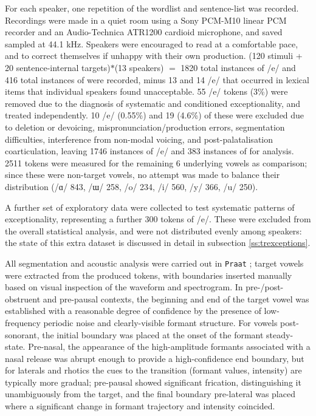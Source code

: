 For each speaker, one repetition of the wordlist and sentence-list was recorded. Recordings were made in a quiet room using a Sony PCM-M10 linear PCM recorder and an Audio-Technica ATR1200 cardioid microphone, and saved sampled at 44.1 kHz. Speakers were encouraged to read at a comfortable pace, and to correct themselves if unhappy with their own production. (120 stimuli + 20 sentence-internal targets)$*$(13 speakers) $=$ 1820 total instances of /e/ and 416 total instances of \ur{\o} were recorded, minus 13 \ur{\o} and 14 /e/ that occurred in lexical items that individual speakers found unacceptable. 55 /e/ tokens (3\%) were removed due to the diagnosis of systematic and conditioned exceptionality, and treated independently. 10 /e/ (0.55\%) and 19 \ur{\o} (4.6\%) of these were excluded due to deletion or devoicing, mispronunciation/production errors, segmentation difficulties, interference from non-modal voicing, and post-palatalisation coarticulation, leaving 1746 instances of /e/ and 383 instances of \ur{\o} for analysis. 2511 tokens were measured for the remaining 6 underlying vowels as comparison; since these were non-target vowels, no attempt was made to balance their distribution (/ɑ/ 843, /ɯ/ 258, /o/ 234, /i/ 560, /y/ 366, /u/ 250).

A further set of exploratory data were collected to test systematic patterns of exceptionality, representing a further 300 tokens of /e/. These were excluded from the overall statistical analysis, and were not distributed evenly among speakers: the state of this extra dataset is discussed in detail in subsection \ref{ss:trexceptions}.

All segmentation and acoustic analysis were carried out in \texttt{Praat} \citep{Praat}; target vowels were extracted from the produced tokens, with boundaries inserted manually based on visual inspection of the waveform and spectrogram. In pre-/post- obstruent and pre-pausal contexts, the beginning and end of the target vowel was established with a reasonable degree of confidence by the presence of low-frequency periodic noise and clearly-visible formant structure. For vowels post-sonorant, the initial boundary was placed at the onset of the formant steady-state. Pre-nasal, the appearance of the high-amplitude formants associated with a nasal release was abrupt enough to provide a high-confidence end boundary, but for laterals and rhotics the cues to the transition (formant values, intensity) are typically more gradual; pre-pausal  showed significant frication, distinguishing it unambiguously from the target, and the final boundary pre-lateral was placed where a significant change in formant trajectory and intensity coincided.


